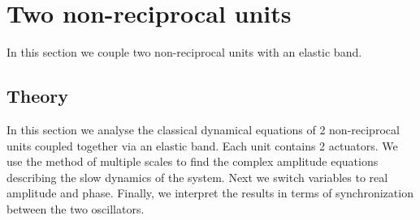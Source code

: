\documentclass[11pt, a4paper]{article} %
\begin{document}

\section{Two non-reciprocal units}
\label{sec:two_units}
In this section we couple two non-reciprocal units with an elastic band. 

\subsection{Theory}
\label{subsec:2units_theory}

In this section we analyse the classical dynamical equations of 2 non-reciprocal units coupled together via an elastic band. 
Each unit contains 2 actuators. We use the method of multiple scales to find the complex amplitude equations describing the slow dynamics of the system. 
Next we switch variables to real amplitude and phase. Finally, we interpret the results in terms of synchronization between the two oscillators.
\end{document}
